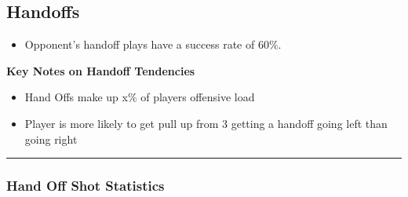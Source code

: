 \documentclass[a4paper,12pt]{article}
\begin{document}
\clearpage


\subsection{Handoffs}
\begin{itemize}
    \item Opponent's handoff plays have a success rate of 60\%.
\end{itemize}

\vspace{1.25em} %
\textbf{Key Notes on Handoff Tendencies}
\vspace{0.5em} %

\begin{itemize}
    \item Hand Offs make up x\% of players offensive load
    \vspace{0.3em} %
    \item Player is more likely to get pull up from 3 getting a handoff going left than going right
\end{itemize}

\vspace{1em} %
\hrule height 1pt width 1\textwidth %
\vspace{0em} %

\subsubsection{Hand Off Shot Statistics}
\end{document}
